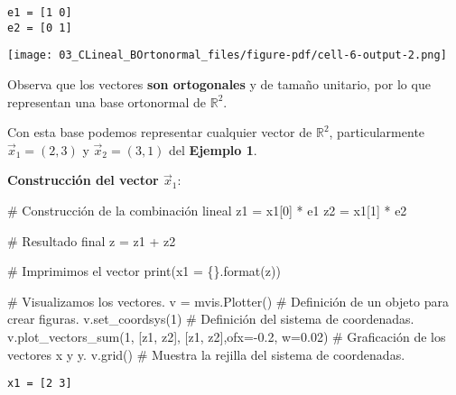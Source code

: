 \documentclass[
  letterpaper,
  DIV=11,
  numbers=noendperiod]{scrreprt}
\newenvironment{Shaded}{\begin{snugshade}}{\end{snugshade}}
\newcommand{\BuiltInTok}[1]{\textcolor[rgb]{0.00,0.23,0.31}{#1}}
\newcommand{\CommentTok}[1]{\textcolor[rgb]{0.37,0.37,0.37}{#1}}
\newcommand{\DecValTok}[1]{\textcolor[rgb]{0.68,0.00,0.00}{#1}}
\newcommand{\FloatTok}[1]{\textcolor[rgb]{0.68,0.00,0.00}{#1}}
\newcommand{\NormalTok}[1]{\textcolor[rgb]{0.00,0.23,0.31}{#1}}
\newcommand{\OperatorTok}[1]{\textcolor[rgb]{0.37,0.37,0.37}{#1}}
\newcommand{\SpecialCharTok}[1]{\textcolor[rgb]{0.37,0.37,0.37}{#1}}
\newcommand{\StringTok}[1]{\textcolor[rgb]{0.13,0.47,0.30}{#1}}
\begin{document}
\begin{verbatim}
e1 = [1 0]
e2 = [0 1]
\end{verbatim}

\texttt{[image: 03\_CLineal\_BOrtonormal\_files/figure-pdf/cell-6-output-2.png]}

Observa que los vectores \textbf{son ortogonales} y de tamaño unitario,
por lo que representan una base ortonormal de \(\mathbb{R}^2\).

Con esta base podemos representar cualquier vector de \(\mathbb{R}^2\),
particularmente \(\vec{x}_1 = (2, 3)\) y \(\vec{x}_2 = (3,1)\) del
\textbf{Ejemplo 1}.

\textbf{Construcción del vector \(\vec{x}_1\)}:

\begin{Shaded}
\begin{Highlighting}[]
\CommentTok{\# Construcción de la combinación lineal}
\NormalTok{z1 }\OperatorTok{=}\NormalTok{ x1[}\DecValTok{0}\NormalTok{] }\OperatorTok{*}\NormalTok{ e1 }
\NormalTok{z2 }\OperatorTok{=}\NormalTok{ x1[}\DecValTok{1}\NormalTok{] }\OperatorTok{*}\NormalTok{ e2}

\CommentTok{\# Resultado final}
\NormalTok{z }\OperatorTok{=}\NormalTok{ z1 }\OperatorTok{+}\NormalTok{ z2}

\CommentTok{\# Imprimimos el vector}
\BuiltInTok{print}\NormalTok{(}\StringTok{\textquotesingle{}x1 = }\SpecialCharTok{\{\}}\StringTok{\textquotesingle{}}\NormalTok{.}\BuiltInTok{format}\NormalTok{(z))}

\CommentTok{\# Visualizamos los vectores.}
\NormalTok{v }\OperatorTok{=}\NormalTok{ mvis.Plotter()  }\CommentTok{\# Definición de un objeto para crear figuras.}
\NormalTok{v.set\_coordsys(}\DecValTok{1}\NormalTok{)   }\CommentTok{\# Definición del sistema de coordenadas.}
\NormalTok{v.plot\_vectors\_sum(}\DecValTok{1}\NormalTok{, [z1, z2], [}\StringTok{\textquotesingle{}z1\textquotesingle{}}\NormalTok{, }\StringTok{\textquotesingle{}z2\textquotesingle{}}\NormalTok{],ofx}\OperatorTok{={-}}\FloatTok{0.2}\NormalTok{, w}\OperatorTok{=}\FloatTok{0.02}\NormalTok{) }\CommentTok{\# Graficación de los vectores \textquotesingle{}x\textquotesingle{} y \textquotesingle{}y\textquotesingle{}.}
\NormalTok{v.grid()  }\CommentTok{\# Muestra la rejilla del sistema de coordenadas.}
\end{Highlighting}
\end{Shaded}

\begin{verbatim}
x1 = [2 3]
\end{verbatim}
\end{document}

